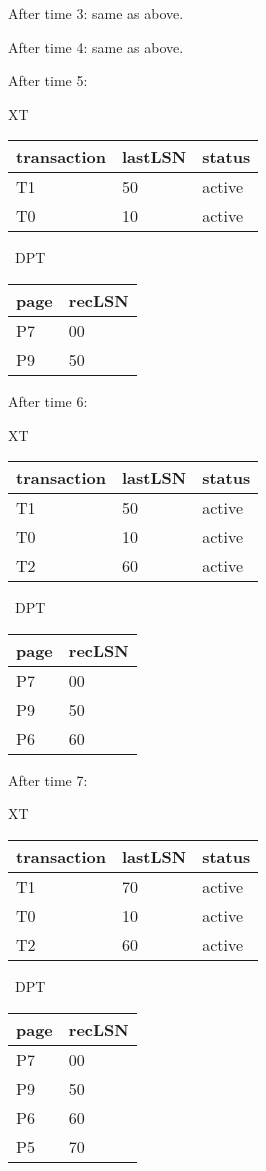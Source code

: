 \documentclass[11pt]{article}
\begin{document}
After time 3: same as above.

After time 4: same as above.

After time 5:

XT   \begin{tabular}{ |l |l |l |}\hline
  transaction & lastLSN & status \\\hline
  T1 & 50 & active  \\\hline
  T0 & 10 & active  \\\hline
  \end{tabular} 
 \ DPT \begin{tabular}{ |l |l |}\hline
    page & recLSN \\\hline
    P7 & 00  \\\hline
    P9 & 50  \\\hline
    \end{tabular}
  
After time 6:

XT   \begin{tabular}{ |l |l |l |}\hline
  transaction & lastLSN & status \\\hline
  T1 & 50 & active  \\\hline
  T0 & 10 & active  \\\hline
  T2 & 60 & active  \\\hline
  \end{tabular} 
 \ DPT \begin{tabular}{ |l |l |}\hline
    page & recLSN \\\hline
    P7 & 00  \\\hline
    P9 & 50  \\\hline
    P6 & 60  \\\hline
    \end{tabular}

After time 7:

XT   \begin{tabular}{ |l |l |l |}\hline
  transaction & lastLSN & status \\\hline
  T1 & 70 & active  \\\hline
  T0 & 10 & active  \\\hline
  T2 & 60 & active  \\\hline
  \end{tabular} 
 \ DPT \begin{tabular}{ |l |l |}\hline
    page & recLSN \\\hline
    P7 & 00  \\\hline
    P9 & 50  \\\hline
    P6 & 60  \\\hline
    P5 & 70  \\\hline
    \end{tabular}
\end{document}
